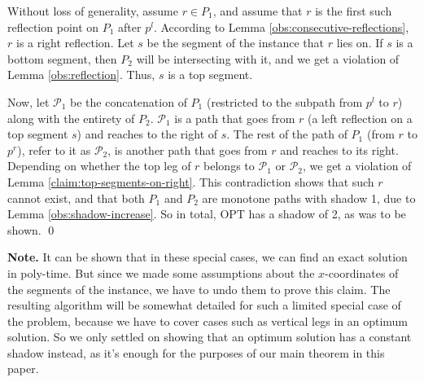 \documentclass[10pt,a4paper]{amsart}
\theoremstyle{thmstyleone}
\newcommand{\OPT}{{\text{OPT}}}
\begin{document}
	Without loss of generality, assume $ r \in P_1 $, and assume that $ r $ is the first such reflection point on $ P_1 $ after $ p^l $. According to Lemma \ref{obs:consecutive-reflections}, $ r $ is a right reflection. Let $ s $ be the segment of the instance that $ r $ lies on. If $ s $ is a bottom segment, then $ P_2 $ will be intersecting with it, and we get a violation of Lemma \ref{obs:reflection}. Thus, $ s $ is a top segment.
	
	Now, let $ \mathcal P_1 $ be the concatenation of $ P_1 $ (restricted to the subpath from $ p^l $ to $ r $) along with the entirety of $ P_2 $. $ \mathcal P_1 $ is a path that goes from $ r $ (a left reflection on a top segment $ s $) and reaches to the right of $ s $. The rest of the path of $ P_1 $ (from $ r $ to $ p^r $), refer to it as $ \mathcal P_2 $, is another path that goes from $ r $ and reaches to its right. Depending on whether the top leg of $ r $ belongs to $ \mathcal P_1 $ or $ \mathcal P_2 $, we get a violation of Lemma \ref{claim:top-segments-on-right}. This contradiction shows that such $ r $ cannot exist, and that both $ P_1 $ and $ P_2 $ are monotone paths with shadow 1, due to Lemma \ref{obs:shadow-increase}. So in total, $ \OPT $ has a shadow of 2, as was to be shown. 
    \qed

    \vspace{.5cm}
    \noindent \textbf{Note.} It can be shown that in these special cases, we can find an exact solution in poly-time. But since we made some assumptions about the $ x $-coordinates of the segments of the instance, we have to undo them to prove this claim. The resulting algorithm will be somewhat detailed for such a limited special case of the problem, because we have to cover cases such as vertical legs in an optimum solution. So we only settled on showing that an optimum solution has a constant shadow instead, as it's enough for the purposes of our main theorem in this paper.
\end{document}
